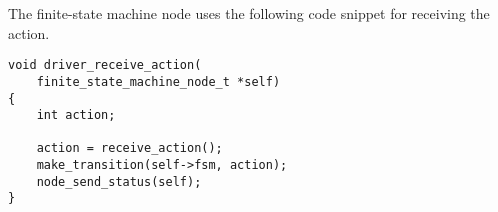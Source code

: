 The finite-state machine node uses the following code snippet for
receiving the action.

\begin{verbatim}
void driver_receive_action(
    finite_state_machine_node_t *self)
{
    int action;

    action = receive_action();
    make_transition(self->fsm, action);
    node_send_status(self);
}
\end{verbatim}
